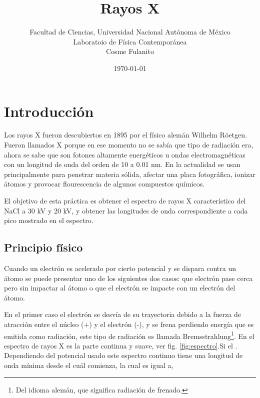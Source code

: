 \documentclass[letterpaper,10pt,twocolumn]{article}
\title{\bf Rayos X}
\author{ Facultad de Ciencias, Universidad Nacional Autónoma de México \\
  Laboratoio de Física Contemporánea \\
  Cosme Fulanito \\}
\date{\today}
\numberwithin{equation}{section}
\begin{document}
\renewcommand{\tablename}{Tabla}


\section{Introducción}
\label{sec:introduccion}

Los rayos X fueron descubiertos en 1895 por el físico alemán Wilhelm Röetgen. Fueron llamados
X porque en ese momento no se sabía que tipo de radiación era, ahora se sabe que son fotones
altamente energéticos u ondas electromagnéticas con un longitud de onda del orden de 10 a
0.01 nm. En la actualidad se usan principalmente para penetrar materia sólida, afectar una
placa fotográfica, ionizar átomos  y provocar flourescencia de algunos compuestos químicos. 

El objetivo de esta práctica es obtener el espectro de rayos X característico del NaCl a 30
kV y 20 kV, y obtener las longitudes de onda correspondiente a cada pico mostrado en el
espectro.

\subsection{Principio físico}
\label{sec:principio}

Cuando un electrón es acelerado por cierto potencial y se dispara contra un átomo se puede
presentar uno de los siguientes dos casos: que electrón pase cerca pero sin impactar al átomo
o que el electrón se impacte con un electrón del átomo.

En el primer caso el electrón se desvía de su trayectoria debido a la fuerza de atracción
entre el núcleo (+) y el electrón (-), y se frena perdiendo energía que es emitida como
radiación, este tipo de radiación es llamada Bremsstrahlung\footnote{Del idioma alemán, que
  significa radiación de frenado.}. En el espectro de rayos X es la parte continua y suave,
ver fig. \ref{fig:espectro}.Si el \cite{gautreau}. Dependiendo del potencial usado este
espectro continuo tiene una longitud de onda mínima desde el cuál comienza, la cual es igual
a,
\end{document}
